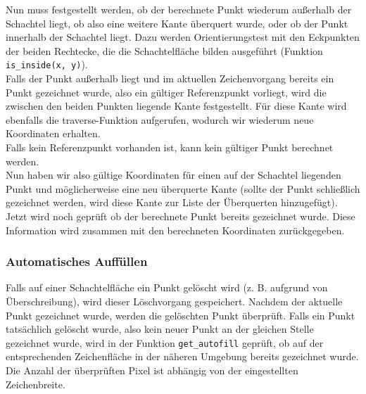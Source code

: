 Nun muss festgestellt werden, ob der berechnete Punkt wiederum außerhalb der Schachtel liegt, ob also eine weitere Kante überquert wurde, oder ob der Punkt innerhalb der Schachtel liegt. Dazu werden Orientierungstest mit den Eckpunkten der beiden Rechtecke, die die Schachtelfläche bilden ausgeführt (Funktion \texttt{is\_inside(x, y)}).\\

Falls der Punkt außerhalb liegt und im aktuellen Zeichenvorgang bereits ein Punkt gezeichnet wurde, also ein gültiger Referenzpunkt vorliegt, wird die zwischen den beiden Punkten liegende Kante festgestellt. Für diese Kante wird ebenfalls die traverse-Funktion aufgerufen, wodurch wir wiederum neue Koordinaten erhalten.\\

Falls kein Referenzpunkt vorhanden ist, kann kein gültiger Punkt berechnet werden.\\

Nun haben wir also gültige Koordinaten für einen auf der Schachtel liegenden Punkt und möglicherweise eine neu überquerte Kante (sollte der Punkt schließlich gezeichnet werden, wird diese Kante zur Liste der Überquerten hinzugefügt). Jetzt wird noch geprüft ob der berechnete Punkt bereits gezeichnet wurde. Diese Information wird zusammen mit den berechneten Koordinaten zurückgegeben.\\


\subsubsection{Automatisches Auffüllen}
\label{subsubsec:auffuellen}

Falls auf einer Schachtelfläche ein Punkt gelöscht wird (z. B. aufgrund von Überschreibung), wird dieser Löschvorgang gespeichert. Nachdem der aktuelle Punkt gezeichnet wurde, werden die gelöschten Punkt überprüft. Falls ein Punkt tatsächlich gelöscht wurde, also kein neuer Punkt an der gleichen Stelle gezeichnet wurde, wird in der Funktion \texttt{get\_autofill} geprüft, ob auf der entsprechenden Zeichenfläche in der näheren Umgebung bereits gezeichnet wurde. Die Anzahl der überprüften Pixel ist abhängig von der eingestellten Zeichenbreite.\\

